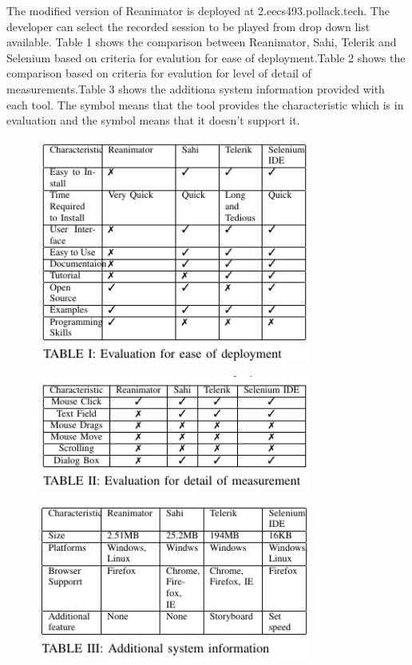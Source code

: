 \documentclass[12pt,journal]{IEEEtran}
\begin{document}
The modified version of Reanimator is deployed at 2.eecs493.pollack.tech. The developer can select the recorded session to be played from drop down list available.
Table 1 shows the comparison between Reanimator, Sahi, Telerik  and Selenium based on criteria for evalution for ease of deployment.Table 2 shows the comparison  based on criteria for evalution for level of detail of measurements.Table 3 shows the additiona system information provided with each tool. The symbol  means that the tool provides the characteristic which is in evaluation and the symbol  means that it doesn’t support it. \\

\begin{figure}[h!]
 \hfill\includegraphics[width=9cm]{figures/table1.PNG}\hspace*{\fill}
\end{figure}
\begin{figure}[h!]
 \hfill\includegraphics[width=9cm]{figures/table2.PNG}\hspace*{\fill}
\end{figure}

\begin{figure}[h!]
 \hfill\includegraphics[width=9cm]{figures/table3.PNG}\hspace*{\fill}
\end{figure}
\end{document}
